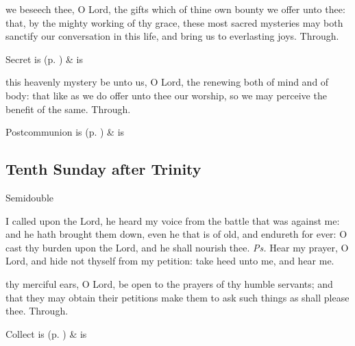 
\secret
{} we beseech thee, O Lord, the gifts which of thine own bounty we offer unto thee: that, by the mighty working of thy grace, these most sacred mysteries may both sanctify our conversation in this life, and bring us to everlasting joys. Through.
\begin{rubric}
     Secret is  (p. \pageref{SPSaints}) \&  is 
\end{rubric}


\postcommunion
{} this heavenly mystery be unto us, O Lord, the renewing both of mind and of body: that like as we do offer unto thee our worship, so we may perceive the benefit of the same. Through.
\begin{rubric}
     Postcommunion is  (p. \pageref{SPSaints}) \&  is 
\end{rubric}


\clearpage
\subsection{Tenth Sunday after Trinity}
\begin{inhead}
{Semidouble}
\end{inhead}


\introit
{} I called upon the Lord, he heard my voice from the battle that was against me: and he hath brought them down, even he that is of old, and endureth for ever: O cast thy burden upon the Lord, and he shall nourish thee. \textit{Ps.} Hear my prayer, O Lord, and hide not thyself from my petition: take heed unto me, and hear me.

\collect
{} thy merciful ears, O Lord, be open to the prayers of thy humble servants; and that they may obtain their petitions make them to ask such things as shall please thee. Through.
\begin{rubric}
     Collect is  (p. \pageref{SPSaints}) \&  is 
\end{rubric}

